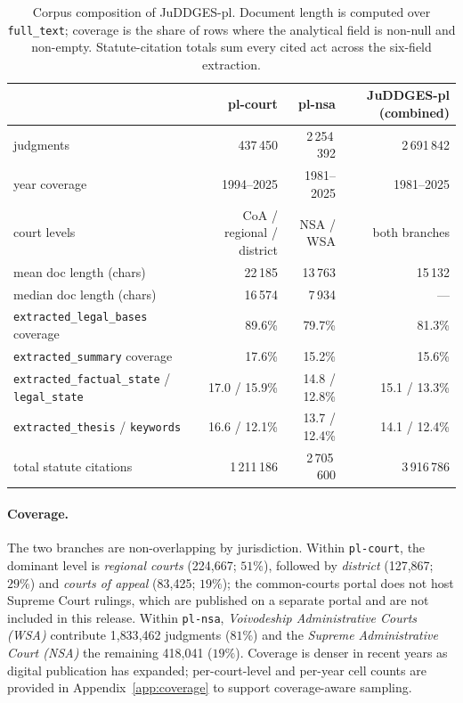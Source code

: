 \documentclass{article}
\begin{document}
\begin{table}[!htb]
\centering
\footnotesize
\begin{tabular}{@{}lrrr@{}}
\toprule
 & \textbf{pl-court} & \textbf{pl-nsa} & \textbf{JuDDGES-pl (combined)} \\
\midrule
judgments                       & 437\,450               & 2\,254\,392          & 2\,691\,842 \\
\quad year coverage             & 1994--2025             & 1981--2025           & 1981--2025 \\
\quad court levels              & CoA / regional / district & NSA / WSA         & both branches \\
mean doc length (chars)         & 22\,185                & 13\,763              & 15\,132 \\
median doc length (chars)       & 16\,574                & 7\,934               & --- \\
\texttt{extracted\_legal\_bases} coverage & 89.6\%       & 79.7\%               & 81.3\% \\
\texttt{extracted\_summary} coverage & 17.6\%            & 15.2\%               & 15.6\% \\
\texttt{extracted\_factual\_state} / \texttt{legal\_state} & 17.0 / 15.9\% & 14.8 / 12.8\% & 15.1 / 13.3\% \\
\texttt{extracted\_thesis} / \texttt{keywords} & 16.6 / 12.1\% & 13.7 / 12.4\% & 14.1 / 12.4\% \\
total statute citations         & 1\,211\,186            & 2\,705\,600          & 3\,916\,786 \\
\bottomrule
\end{tabular}
\caption{Corpus composition of JuDDGES-pl. Document length is computed over \texttt{full\_text}; coverage is the share of rows where the analytical field is non-null and non-empty. Statute-citation totals sum every cited act across the six-field extraction.}
\label{tab:corpus-overview}
\end{table}

\paragraph{Coverage.} The two branches are non-overlapping by jurisdiction. Within \texttt{pl-court}, the dominant level is \emph{regional courts} (224{,}667; $51\%$), followed by \emph{district} (127{,}867; $29\%$) and \emph{courts of appeal} (83{,}425; $19\%$); the common-courts portal does not host Supreme Court rulings, which are published on a separate portal and are not included in this release. Within \texttt{pl-nsa}, \emph{Voivodeship Administrative Courts (WSA)} contribute 1{,}833{,}462 judgments ($81\%$) and the \emph{Supreme Administrative Court (NSA)} the remaining 418{,}041 ($19\%$). Coverage is denser in recent years as digital publication has expanded; per-court-level and per-year cell counts are provided in Appendix~\ref{app:coverage} to support coverage-aware sampling.
\end{document}
